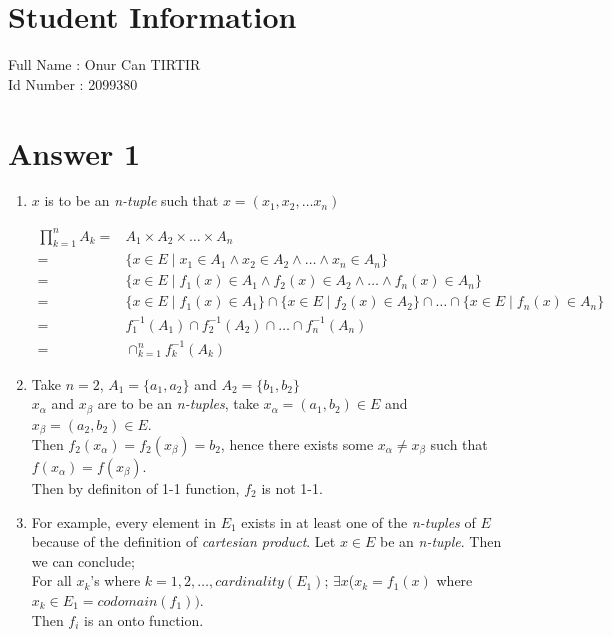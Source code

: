 \documentclass[12pt]{article}
\begin{document}
\section*{Student Information } 
Full Name :  Onur Can TIRTIR\\
Id Number :  2099380\\

\section*{Answer 1}

\begin{enumerate}[label=(\alph*)]

\item $x$ is to be an \textit{n-tuple} such that $x=(x_1, x_2,\dots x_n)$

\begin{align*}
	\prod_{k=1}^{n} A_k = & A_1\times A_2\times\dots \times A_n\\
						= & \{x\in E \mid x_1\in A_1 \wedge x_2\in A_2 \wedge\dots \wedge x_n\in A_n\}\\
						= & \{x\in E \mid f_1(x)\in A_1 \wedge f_2(x)\in A_2 \wedge\dots \wedge f_n(x)\in A_n\}\\
						= & \{x\in E \mid f_1(x)\in A_1\}\cap \{x\in E \mid f_2(x)\in A_2\}\cap\dots \cap \{x\in E \mid f_n(x)\in A_n\}\\
						= & f_{1}^{-1}(A_1)\cap f_{2}^{-1}(A_2)\cap\dots \cap f_{n}^{-1}(A_n)\\
						= & \cap_{k=1}^{n} f_{k}^{-1}(A_k)
\end{align*}
	
\item Take $n=2$, $A_1=\{a_1, a_2\}$ and $A_2=\{b_1, b_2\}$\\
$x_\alpha$ and $x_\beta$ are to be an \textit{n-tuples}, take $x_\alpha=(a_1, b_2)\in E$ and $x_\beta=(a_2, b_2)\in E$.\\
Then $f_2(x_\alpha)=f_2(x_\beta)=b_2$, hence there exists some $x_\alpha\neq x_\beta$ such that $f(x_\alpha)=f(x_\beta)$.\\
Then by definiton of 1-1 function, $f_2$ is not 1-1.

\item For example, every element in $E_1$ exists in at least one of the \textit{n-tuples} of $E$ because of the definition of \textit{cartesian product}. Let $x\in E$ be an \textit{n-tuple}. Then we can conclude;\\
For all $x_k$'s where $k=1, 2,\dots, cardinality(E_1)$; \quad $\exists{x}$($x_k=f_1(x)$ where $x_k\in E_1=codomain(f_1))$.\\
Then $f_i$ is an onto function.


\end{enumerate}
\end{document}
